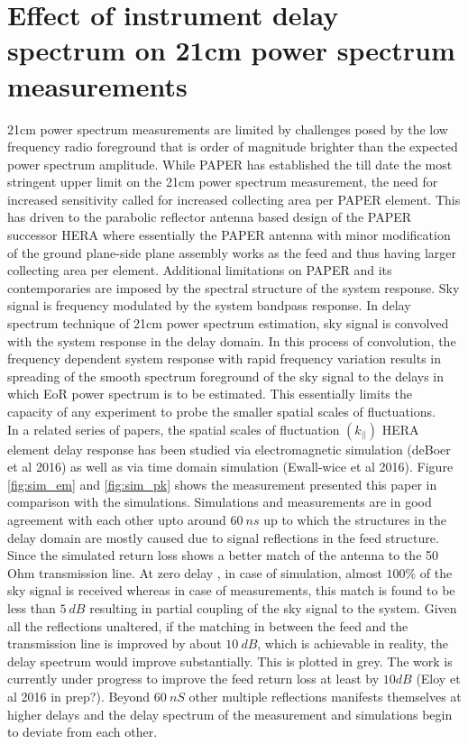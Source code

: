 \documentclass[twocolumn]{emulateapj}
\begin{document}
\section{\textbf{Effect of instrument delay spectrum on 21cm power spectrum measurements}}

21cm power spectrum measurements are limited by challenges posed by the low frequency radio foreground that is order of magnitude brighter than the expected power spectrum amplitude. While PAPER has established the till date the most stringent upper limit on the 21cm power spectrum measurement, the need for increased sensitivity called for increased collecting area per PAPER element. This has driven to the parabolic reflector antenna based design of the PAPER successor HERA where essentially the PAPER antenna with minor modification of the ground plane-side plane assembly works as the feed and thus having larger collecting area per element. Additional limitations on PAPER and its contemporaries are imposed by the spectral structure of the system response. Sky signal is frequency modulated by the system bandpass response. In delay spectrum technique of 21cm power spectrum estimation, sky signal is convolved with the system response in the delay domain. In this process of convolution, the frequency dependent system response with rapid frequency variation results in spreading of the smooth spectrum foreground of the sky signal to the delays in which EoR power spectrum is to be estimated. This essentially limits the capacity of any experiment to probe the smaller spatial scales of fluctuations. \\
	In a related series of papers, the spatial scales of fluctuation $(k_||)$ HERA element delay response has been studied via electromagnetic simulation (deBoer et al 2016) as well as via time domain simulation (Ewall-wice et al 2016). Figure \ref{fig:sim_em} and \ref{fig:sim_pk} shows the measurement presented this paper in comparison with the simulations. Simulations and measurements are in good agreement with each other upto around $60~ns$ up to which the structures in the delay domain are mostly caused due to signal reflections in the feed structure. Since the simulated return loss shows a better match of the antenna to the 50 Ohm transmission line. At zero delay , in case of simulation, almost $100\%$ of the sky signal is received whereas in case of measurements, this match is found to be less than $5~dB$ resulting in partial coupling of the sky signal to the system. Given all the reflections unaltered, if the matching in between the feed and the transmission line is improved by about $10~dB$, which is achievable in reality, the delay spectrum would improve substantially. This is plotted in grey. The work is currently under progress to improve the feed return loss at least by  $10dB$ (Eloy et al 2016 in prep?). Beyond $60~nS$ other multiple reflections manifests themselves at higher delays and the delay spectrum of the measurement and simulations begin to deviate from each other.\\
\end{document}
